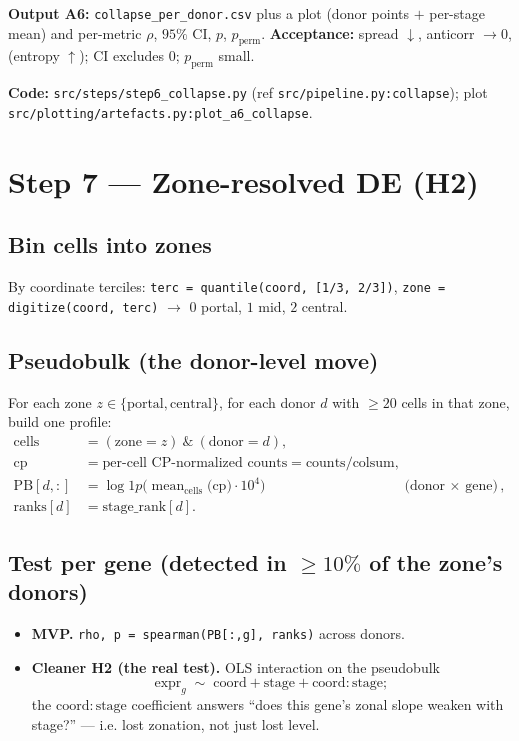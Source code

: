 \documentclass[11pt]{article}
\newcommand{\code}[1]{\texttt{\small #1}}
\newcommand{\coordc}{\mathrm{coord}}
\begin{document}
\textbf{Output A6:} \code{collapse\_per\_donor.csv} plus a plot (donor points $+$ per-stage mean)
and per-metric $\rho$, $95\%$ CI, $p$, $p_{\text{perm}}$.
\textbf{Acceptance:} spread $\downarrow$, anticorr $\to 0$, (entropy $\uparrow$); CI excludes $0$;
$p_{\text{perm}}$ small.

\medskip
\noindent\textbf{Code:} \code{src/steps/step6\_collapse.py} (ref \code{src/pipeline.py:collapse});
plot \code{src/plotting/artefacts.py:plot\_a6\_collapse}.

\section{Step 7 --- Zone-resolved DE (H2)}

\subsection{Bin cells into zones}
By coordinate terciles: \code{terc = quantile(coord, [1/3, 2/3])},
\code{zone = digitize(coord, terc)} $\rightarrow$ $0$ portal, $1$ mid, $2$ central.

\subsection{Pseudobulk (the donor-level move)}
For each zone $z \in \{\text{portal}, \text{central}\}$, for each donor $d$ with $\ge 20$ cells in
that zone, build one profile:
\begin{align}
  \text{cells}  &= (\text{zone}=z)\ \&\ (\text{donor}=d), \\
  \text{cp}     &= \text{per-cell CP-normalized counts} = \text{counts} / \text{colsum}, \\
  \text{PB}[d,:] &= \log\!1p\!\Big(\operatorname{mean}_{\text{cells}}\big(\text{cp}\big) \cdot 10^4\Big)
                    && \text{(donor $\times$ gene)}, \\
  \text{ranks}[d] &= \text{stage\_rank}[d].
\end{align}

\subsection{Test per gene (detected in $\ge 10\%$ of the zone's donors)}
\begin{itemize}[leftmargin=1.4em]
  \item \textbf{MVP.} \code{rho, p = spearman(PB[:,g], ranks)} across donors.
  \item \textbf{Cleaner H2 (the real test).} OLS interaction on the pseudobulk
        \[
          \text{expr}_g \;\sim\; \coordc + \text{stage} + \coordc{:}\text{stage};
        \]
        the $\coordc{:}\text{stage}$ coefficient answers ``does this gene's zonal slope weaken with
        stage?'' --- i.e. lost zonation, not just lost level.
\end{itemize}
\end{document}
